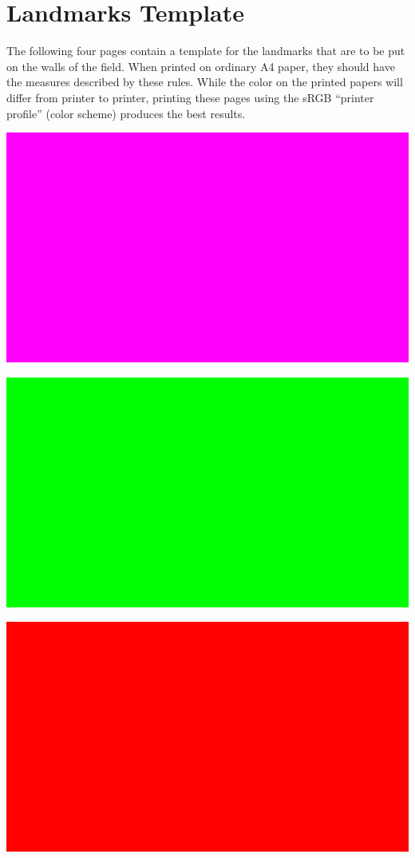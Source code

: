 \documentclass{article}
\begin{document}
\section{Landmarks Template\label{ref-066}}

The following four pages contain a template for the landmarks that are to be put on the walls of the field. When printed on ordinary A4 paper, they should have the measures described by these rules. While the color on the printed papers will differ from printer to printer, printing these pages using the sRGB ``printer profile'' (color scheme) produces the best results.

\includegraphics[width=1\textwidth]{media/image11.png}

\includegraphics[width=1\textwidth]{media/image12.png}

\includegraphics[width=1\textwidth]{media/image13.png}
\end{document}
